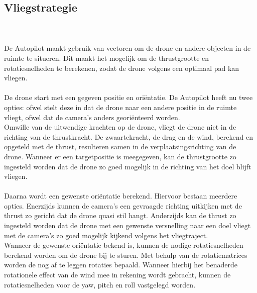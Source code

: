 \subsection{Vliegstrategie}
\\
\\
De Autopilot maakt gebruik van vectoren om de drone en andere objecten in de ruimte te situeren. Dit maakt het mogelijk om de thrustgrootte en rotatiesnelheden te berekenen, zodat de drone volgens een optimaal pad kan vliegen.
\\
\\
De drone start met een gegeven positie en ori\"entatie. De Autopilot heeft nu twee opties: ofwel stelt deze in dat de drone naar een andere positie in de ruimte vliegt, ofwel dat de camera's anders geori\"enteerd worden.
\\
Omwille van de uitwendige krachten op de drone, vliegt de drone niet in de richting van de thrustkracht. De zwaartekracht, de drag en de wind, berekend en opgeteld met de thrust, resulteren samen in de verplaatsingsrichting van de drone. Wanneer er een targetpositie is meegegeven, kan de thrustgrootte zo ingesteld worden dat de drone zo goed mogelijk in de richting van het doel blijft vliegen.
\\
\\
Daarna wordt een gewenste ori\"entatie berekend. Hiervoor bestaan meerdere opties. Enerzijds kunnen de camera's een gevraagde richting uitkijken met de thrust zo gericht dat de drone quasi stil hangt. Anderzijds kan de thrust zo ingesteld worden dat de drone met een gewenste versnelling naar een doel vliegt met de camera's zo goed mogelijk kijkend volgens het vliegtraject.
\\
Wanneer de gewenste ori\"entatie bekend is, kunnen de nodige rotatiesnelheden berekend worden om de drone bij te sturen. Met behulp van de rotatiematrices worden de nog af te leggen rotaties bepaald. Wanneer hierbij het benaderde rotationele effect van de wind mee in rekening wordt gebracht, kunnen de rotatiesnelheden voor de yaw, pitch en roll vastgelegd worden.